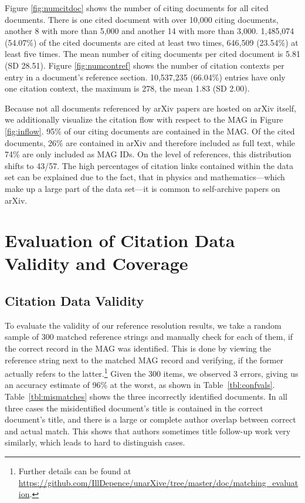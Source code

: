 Figure \ref{fig:numcitdoc} shows the number of citing documents for all cited documents. There is one cited document with over 10,000 citing documents, another 8 with more than 5,000 and another 14 with more than 3,000. 1,485,074 (54.07\%) of the cited documents are cited at least two times, 646,509 (23.54\%) at least five times. The mean number of citing documents per cited document is 5.81 (SD 28.51). Figure \ref{fig:numcontref} shows the number of citation contexts per entry in a document's reference section. 10,537,235 (66.04\%) entries have only one citation context, the maximum is 278, the mean 1.83 (SD 2.00).

Because not all documents referenced by arXiv papers are hosted on arXiv itself, we additionally visualize the citation flow with respect to the MAG in Figure \ref{fig:inflow}. 95\% of our citing documents are contained in the MAG. Of the cited documents, 26\% are contained in arXiv and therefore included as full text, while 74\% are only included as MAG IDs. On the level of references, this distribution shifts to 43/57. The high percentages of citation links contained within the data set can be explained due to the fact, that in physics and mathematics---which make up a large part of the data set---it is common to self-archive papers on arXiv.

\section{Evaluation of Citation Data Validity and Coverage}
\label{sec:evaluation-validity-and-coverage}

\subsection{Citation Data Validity}
\label{sec:evaluation-reference-resolution}
To evaluate the validity of our reference resolution results, we take a random sample of 300 matched reference strings and manually check for each of them, if the correct record in the MAG was identified. This is done by viewing the reference string next to the matched MAG record and verifying, if the former actually refers to the latter.\footnote{Further details can be found at \url{https://github.com/IllDepence/unarXive/tree/master/doc/matching_evaluation}.} Given the 300 items, we observed 3 errors, giving us an accuracy estimate of 96\% at the worst, as shown in Table~\ref{tbl:confvals}. Table~\ref{tbl:mismatches} shows the three incorrectly identified documents. In all three cases the misidentified document's title is contained in the correct document's title, and there is a large or complete author overlap between correct and actual match. This shows that authors sometimes title follow-up work very similarly, which leads to hard to distinguish cases.

